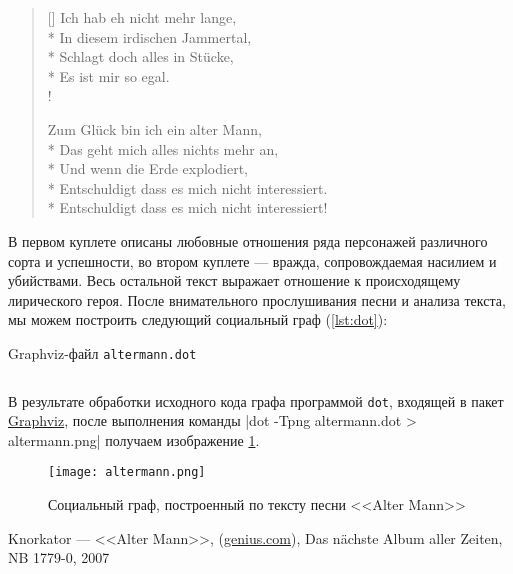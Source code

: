 \documentclass[a4paper,12pt,notitlepage]{article}
\begin{document}
\begin{verse}[\versewidth]
		Ich hab eh nicht mehr lange, \\*
		In diesem irdischen Jammertal, \\*
		Schlagt doch alles in Stücke, \\*
		Es ist mir so egal. \\!
		
		Zum Glück bin ich ein alter Mann, \\*
		Das geht mich alles nichts mehr an, \\*
		Und wenn die Erde explodiert, \\*
		Entschuldigt dass es mich nicht interessiert. \\*
		Entschuldigt dass es mich nicht interessiert! \\
  \end{verse}
  
  В первом куплете описаны любовные отношения ряда персонажей различного сорта и успешности, во втором куплете --- вражда, сопровождаемая насилием и убийствами. Весь остальной текст выражает отношение к происходящему лирического героя. После внимательного прослушивания песни и анализа текста, мы можем построить следующий социальный граф (\ref{lst:dot}):
  
    \begin{listing}[H]
      \caption{Graphviz-файл \texttt{altermann.dot}}
      \label{lst:dot}
      \inputminted[linenos,fontsize=\small]{dot}{altermann.dot}
    \end{listing}
    
    \newpage

    В результате обработки исходного кода графа программой \texttt{dot}, входящей в пакет \href{https://http://www.graphviz.org/}{Graphviz}, после выполнения команды |dot -Tpng altermann.dot > altermann.png| получаем изображение \ref{fig:graph}.
    
    
    \begin{figure}[ht]
      \centering
      \texttt{[image: altermann.png]}
      \caption{Социальный граф, построенный по тексту песни <<Alter Mann>>}
      \label{fig:graph}
    \end{figure}
    
    \newpage
    \listoflistings
    \listoffigures
    \begin{thebibliography}{1}
      Knorkator --- <<Alter Mann>>, (\href{https://genius.com/Knorkator-alter-mann-lyrics}{genius.com}), Das nächste Album aller Zeiten, NB 1779-0, 2007

\end{thebibliography}
    
    
  
      
\end{document}
